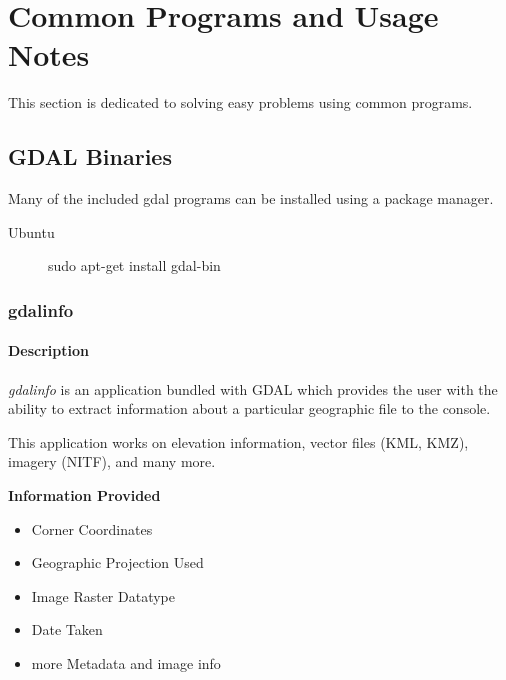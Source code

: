 \chapter*{Common Programs and Usage Notes}
This section is dedicated to solving easy problems using common programs.  

\section*{GDAL Binaries}

Many of the included gdal programs can be installed using a package manager. 

\begin{description}
\item[Ubuntu] sudo apt-get install gdal-bin
\end{description}

\subsection*{gdalinfo}

\subsubsection*{Description}
\emph{gdalinfo} is an application bundled with GDAL which provides the user with the ability to extract information about a 
particular geographic file to the console.   

This application works on elevation information, vector files (KML, KMZ), imagery (NITF), and many more. 

\noindent\textbf{ Information Provided}
\begin{itemize}
\item Corner Coordinates
\item Geographic Projection Used
\item Image Raster Datatype
\item Date Taken
\item more Metadata and image info
\end{itemize}

